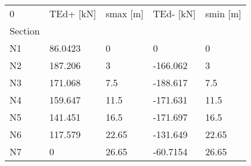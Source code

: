 \begin{tabular}{lllll}
\toprule
0 & TEd+ [kN] & smax [m] & TEd- [kN] & smin [m] \\
Section &           &          &           &          \\
\midrule
N1      &   86.0423 &        0 &         0 &        0 \\
N2      &   187.206 &        3 &  -166.062 &        3 \\
N3      &   171.068 &      7.5 &  -188.617 &      7.5 \\
N4      &   159.647 &     11.5 &  -171.631 &     11.5 \\
N5      &   141.451 &     16.5 &  -171.697 &     16.5 \\
N6      &   117.579 &    22.65 &  -131.649 &    22.65 \\
N7      &         0 &    26.65 &  -60.7154 &    26.65 \\
\bottomrule
\end{tabular}
